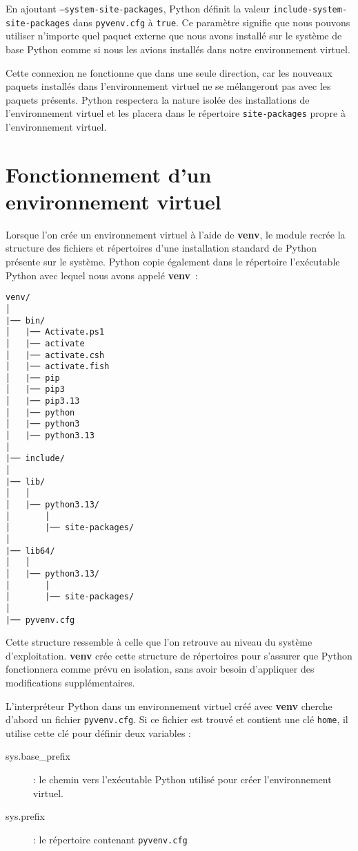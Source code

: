En ajoutant \texttt{--system-site-packages}, Python définit la valeur \texttt{include-system-}\\
\texttt{site-packages} dans \texttt{pyvenv.cfg} à \texttt{true}. Ce paramètre signifie que nous pouvons utiliser n’importe quel paquet externe que nous avons installé sur le système de base Python comme si nous les avions installés dans notre environnement virtuel.

Cette connexion ne fonctionne que dans une seule direction, car les nouveaux paquets installés dans l'environnement virtuel ne se mélangeront pas avec les paquets présents. Python respectera la nature isolée des installations de l'environnement virtuel et les placera dans le répertoire \texttt{site-packages} propre à l’environnement virtuel.

\section{Fonctionnement d'un environnement virtuel}

Lorsque l'on crée un environnement virtuel à l’aide de \textbf{venv}, le module recrée la structure des fichiers et répertoires d’une installation standard de Python présente sur le système. Python copie également dans le répertoire l’exécutable Python avec lequel nous avons appelé \textbf{venv} :
\begin{verbatim}
venv/
│
|── bin/
│   |── Activate.ps1
│   |── activate
│   |── activate.csh
│   |── activate.fish
│   |── pip
│   |── pip3
│   |── pip3.13
│   |── python
│   |── python3
│   |── python3.13
│
|── include/
│
|── lib/
│   │
│   |── python3.13/
│       │
│       |── site-packages/
│
|── lib64/
│   │
│   |── python3.13/
│       │
│       |── site-packages/
│
|── pyvenv.cfg
\end{verbatim}

Cette structure ressemble à celle que l'on retrouve au niveau du système d'exploitation. \textbf{venv} crée cette structure de répertoires pour s’assurer que Python fonctionnera comme prévu en isolation, sans avoir besoin d’appliquer des modifications supplémentaires. 

L'interpréteur Python dans un environnement virtuel créé avec \textbf{venv} cherche d'abord un fichier \texttt{pyvenv.cfg}. Si ce fichier est trouvé et contient une clé \texttt{home}, il utilise cette clé pour définir deux variables :

\begin{description}
    \item[sys.base\_prefix] : le chemin vers l'exécutable Python utilisé pour créer l'environnement virtuel.
    \item[sys.prefix] : le répertoire contenant \texttt{pyvenv.cfg}
\end{description}

